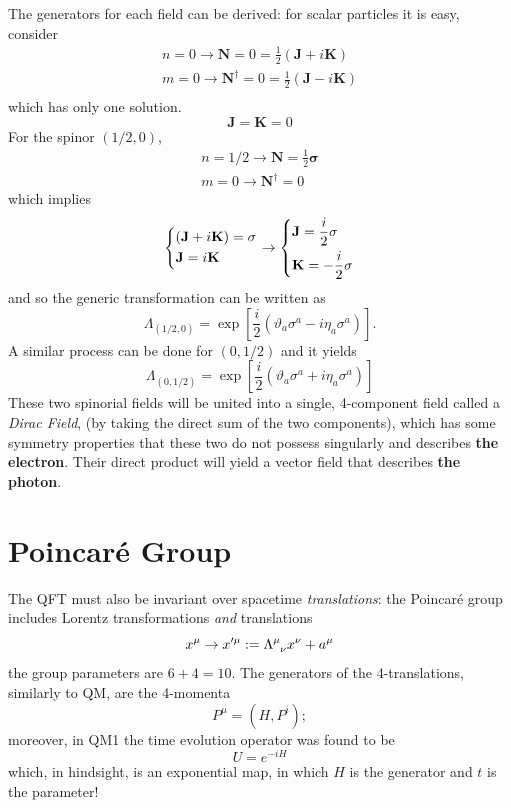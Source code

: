The generators for each field can be derived: for scalar particles it is easy,
consider
\begin{gather*}
n=0\rightarrow \mathbf{N}=0=\frac{1}{2}\left(\mathbf{J}+i\mathbf{K}\right)\\
m=0\rightarrow \mathbf{N^\dagger}=0=\frac{1}{2}\left(\mathbf{J}-i\mathbf{K}\right)\\
\end{gather*}
which has only one solution.
$$\mathbf{J}=\mathbf{K}=0$$
For the spinor $\left(1/2,0\right)$,
\begin{gather*}
n=1/2\rightarrow\mathbf{N} = \frac{1}{2}\mathbf{\sigma}\\
m=0\rightarrow\mathbf{N^\dagger} = 0
\end{gather*}
which implies
$$\begin{dcases*}
  \left(\mathbf{J}+i\mathbf{K}\right)=\mathbf{\sigma}\\
  \mathbf{J} = i\mathbf{K}
  \end{dcases*} \rightarrow
  \begin{dcases*}
  \mathbf{J} = \frac{i}{2}\mathbf{\sigma}\\
  \mathbf{K} = -\frac{i}{2}\mathbf{\sigma}
  \end{dcases*}
$$
and so the generic transformation can be written as
$$\Lambda_{(1/2,0)} = \exp\left[\frac{i}{2}\left(\vartheta_a\sigma^a-
i\eta_a\sigma^a\right)\right].$$
A similar process can be done for $(0,1/2)$ and it yields
$$\Lambda_{(0,1/2)} = \exp\left[\frac{i}{2}\left(\vartheta_a\sigma^a+
i\eta_a\sigma^a\right)\right]$$
These two spinorial fields will be united into a single, 4-component field called
a \textit{Dirac Field}, (by taking the direct sum of the two components),
which has some symmetry properties that these two do not possess singularly and
describes \textbf{the electron}. Their direct product will yield a vector field
that describes \textbf{the photon}.
%
\section{Poincaré Group}
The QFT must also be invariant over spacetime \textit{translations}: the Poincaré
group includes Lorentz transformations \textit{and} translations
$$x^\mu\rightarrow x'^\mu:=\Lambda\indices{^\mu_\nu}x^\nu + a^\mu$$
the group parameters are $6+4=10$. The generators of the 4-translations,
similarly to QM, are the 4-momenta
$$P^\mu = (H,P^i);$$
moreover, in QM1 the time evolution operator was found to be
$$U=e^{-iH}$$
which, in hindsight, is an exponential map, in which $H$ is the generator and $t$ is
the parameter!

